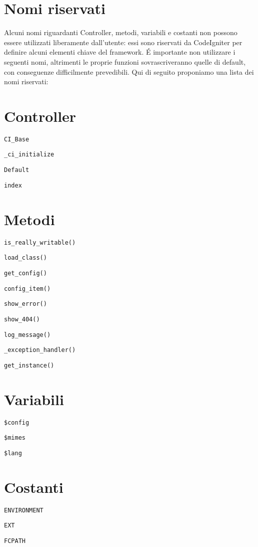 \section{Nomi riservati}
\label{cap:nomiriservati}
Alcuni nomi riguardanti Controller, metodi, variabili e costanti non possono essere utilizzati liberamente dall'utente: essi sono riservati da CodeIgniter per definire alcuni elementi chiave del framework. \'E importante non utilizzare i seguenti nomi, altrimenti le proprie funzioni sovrascriveranno quelle di default, con conseguenze difficilmente prevedibili. Qui di seguito proponiamo una lista dei nomi riservati:

\section*{Controller}
\verb|CI_Base|

\verb|_ci_initialize|

\verb|Default|

\verb|index|

\section*{Metodi}
\verb|is_really_writable()|

\verb|load_class()|

\verb|get_config()|

\verb|config_item()|

\verb|show_error()|

\verb|show_404()|

\verb|log_message()|

\verb|_exception_handler()|

\verb|get_instance()|

\section*{Variabili}
\verb|$config|

\verb|$mimes|

\verb|$lang|

\section*{Costanti}
\verb|ENVIRONMENT|

\verb|EXT|

\verb|FCPATH|

